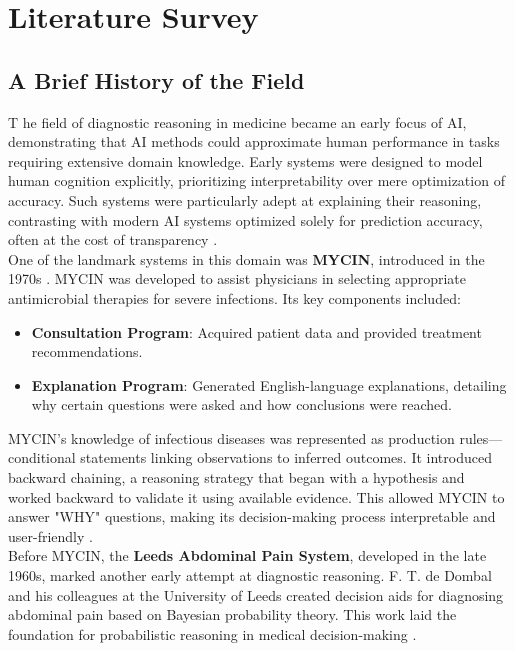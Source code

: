 \section{Literature Survey}
\label{sec:sota}
\subsection{A Brief History of the Field}
\lettrine{T}{ }he field of diagnostic reasoning in medicine became an early focus of AI, demonstrating that AI methods could approximate human performance in tasks requiring extensive domain knowledge. Early systems were designed to model human cognition explicitly, prioritizing interpretability over mere optimization of accuracy. Such systems were particularly adept at explaining their reasoning, contrasting with modern AI systems optimized solely for prediction accuracy, often at the cost of transparency \cite{cohen2022introducing}.\\[\baselineskip]

\noindent One of the landmark systems in this domain was \textcolor{TUMRed}{\textbf{MYCIN}}, introduced in the 1970s \cite{cohen2022intelligent, shortliffe2012computer, shortliffe1975model}. MYCIN was developed to assist physicians in selecting appropriate antimicrobial therapies for severe infections. Its key components included:
\begin{itemize}
    \item \textcolor{TUMRed}{\textbf{Consultation Program}}: Acquired patient data and provided treatment recommendations.
    \item \textcolor{TUMRed}{\textbf{Explanation Program}}: Generated English-language explanations, detailing why certain questions were asked and how conclusions were reached.
\end{itemize}

\noindent MYCIN's knowledge of infectious diseases was represented as production rules---conditional statements linking observations to inferred outcomes. It introduced backward chaining, a reasoning strategy that began with a hypothesis and worked backward to validate it using available evidence. This allowed MYCIN to answer "WHY" questions, making its decision-making process interpretable and user-friendly \cite{shortliffe1975model, musen2021clinical}.\\[\baselineskip]

\noindent Before MYCIN, the \textcolor{TUMRed}{\textbf{Leeds Abdominal Pain System}}, developed in the late 1960s, marked another early attempt at diagnostic reasoning. F. T. de Dombal and his colleagues at the University of Leeds created decision aids for diagnosing abdominal pain based on Bayesian probability theory. This work laid the foundation for probabilistic reasoning in medical decision-making \cite{musen2021clinical}.\\[\baselineskip]

